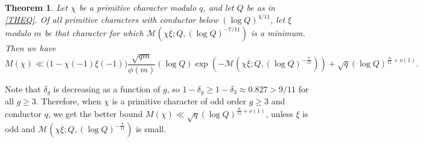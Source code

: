 \documentclass[12pt]{amsart}
\newtheorem{thm}{Theorem}[section]
\theoremstyle{definition}
\numberwithin{equation}{section}
\newcommand{\mc}{\mathcal}
\renewcommand{\bar}{\overline}
\begin{document}
\begin{thm}\label{COND}
Let $\chi$ be a primitive character modulo $q$, and let $Q$ be as in \eqref{THEQ}.  Of all primitive characters with conductor below $(\log Q)^{4/11}$, let $\xi$ modulo $m$ be that character for which $\mc{M}\left(\chi\bar{\xi};Q, (\log Q)^{-7/11}\right)$ is a minimum. Then we have
\begin{equation*}
M(\chi) \ll \Big(1-\chi(-1)\xi(-1)\Big)\frac{\sqrt{qm}}{\phi(m)} (\log Q) \exp\left(-\mc{M}\left(\chi\bar{\xi}; Q,(\log Q)^{-\frac{7}{11}}\right)\right) + \sqrt{q}\left(\log Q\right)^{\frac{9}{11} + o(1)}.
\end{equation*}
\end{thm}
Note that $\delta_g$ is decreasing as a function of $g$, so $1-\delta_g \geq 1-\delta_3\approx 0.827>9/11$ for all $g \geq 3$. Therefore, when $\chi$ is a primitive character of odd order $g\geq 3$ and conductor $q$, we get the better bound 
$ M(\chi)\ll \sqrt{q}\left(\log Q\right)^{\frac{9}{11} + o(1)}$, unless $\xi$ is odd and $\mc{M}\left(\chi\bar{\xi}; Q,(\log Q)^{-\frac{7}{11}}\right)$ is small.

\end{document}
